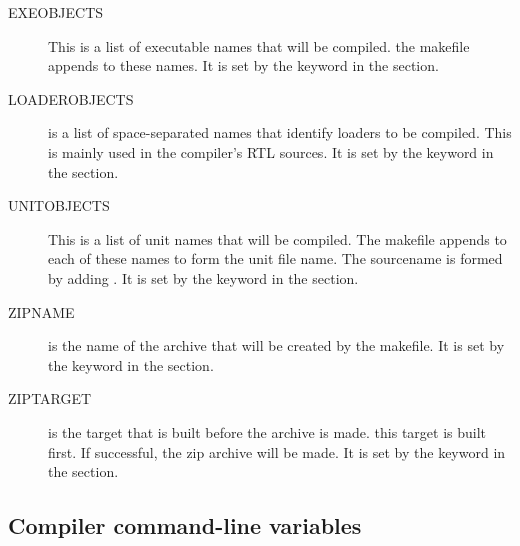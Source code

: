 \begin{description}
\item[EXEOBJECTS] This is a list of executable names that will be compiled.
the makefile appends  to these names. It is set by the
 keyword in the  section.

\item[LOADEROBJECTS] is a list of space-separated names that identify
loaders to be compiled. This is mainly used in the compiler's RTL sources.
It is set by the  keyword in the  section.

\item[UNITOBJECTS] This is a list of unit names that will be compiled. The
makefile appends  to each of these names to form the unit file
name. The sourcename is formed by adding .
It is set by the  keyword in the  section.

\item[ZIPNAME] is the name of the archive that will be created by the
makefile.
It is set by the  keyword in the  section.

\item[ZIPTARGET] is the target that is built before the archive is made.
this target is built first. If successful, the zip archive will be made.
It is set by the  keyword in the  section.

\end{description}

\subsection{Compiler command-line variables}

